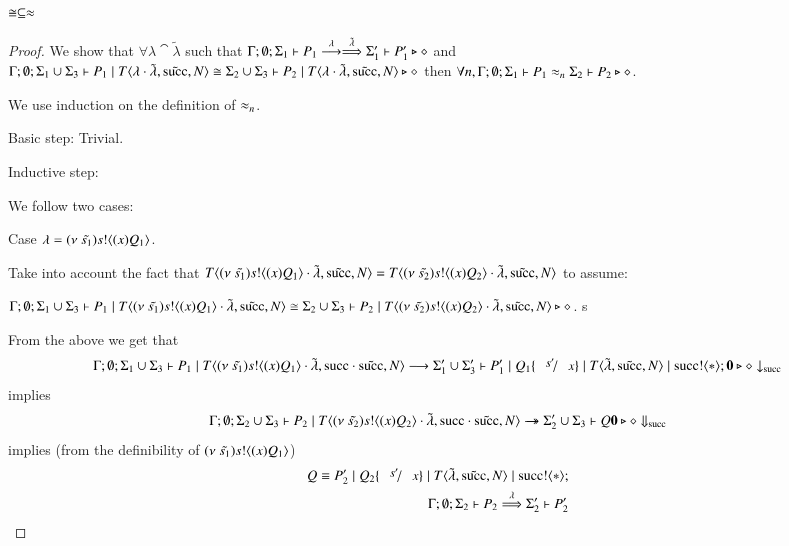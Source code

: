 \begin{lemma}\rm
	\label{lem:cong_is_wb}
	$\cong \subseteq \approx$
\end{lemma}

\begin{proof}
	We show that $\forall \lambda \cat \tilde{\lambda}$ such that $\Gamma; \emptyset; \Sigma_1 \vdash P_1 \stackrel{\lambda}{\longrightarrow} \stackrel{\tilde{\lambda}}{\Longrightarrow} \Sigma_1' \vdash P_1' \triangleright \diamond$
	and $\Gamma; \emptyset; \Sigma_1 \cup \Sigma_3 \vdash P_1 \;|\; T\langle \lambda \cdot \tilde{\lambda}, \tilde{\textrm{succ}}, N \rangle \cong \Sigma_2 \cup \Sigma_3 \vdash P_2 \;|\; T\langle \lambda \cdot \tilde{\lambda}, \tilde{\textrm{succ}}, N \rangle \triangleright \diamond$ then $\forall n, \Gamma; \emptyset; \Sigma_1 \vdash P_1 \approx_n \Sigma_2 \vdash P_2 \triangleright \diamond$.

	We use induction on the definition of $\approx_n$.

	Basic step: Trivial.

	Inductive step:

	We follow two cases:

	Case $\lambda = (\nu\ \tilde{s_1}) s ! \langle (x)Q_1 \rangle$.

	Take into account the fact that
	$T\langle (\nu\ \tilde{s_1}) s ! \langle (x)Q_1 \rangle \cdot \tilde{\lambda}, \tilde{\textrm{succ}}, N \rangle = T\langle (\nu\ \tilde{s_2}) s ! \langle (x)Q_2 \rangle \cdot \tilde{\lambda}, \tilde{\textrm{succ}}, N \rangle$
	to assume:

	$\Gamma; \emptyset; \Sigma_1 \cup \Sigma_3 \vdash P_1 \;|\; T\langle (\nu\ \tilde{s_1}) s ! \langle (x)Q_1 \rangle \cdot \tilde{\lambda}, \tilde{\textrm{succ}}, N \rangle \cong \Sigma_2 \cup \Sigma_3 \vdash P_2 \;|\; T\langle (\nu\ \tilde{s_2}) s ! \langle (x)Q_2 \rangle \cdot \tilde{\lambda}, \tilde{\textrm{succ}}, N \rangle \triangleright \diamond$.
s

	From the above we get that
	\[
		\Gamma; \emptyset; \Sigma_1 \cup \Sigma_3 \proves P_1 \Par T\lrangle{\news{\tilde{s_1}} \bactout{s}{\abs{x}{Q_1}} \cat \tilde{\lambda}, \suc \cat \tilde{\suc}, N} \red \Sigma_1' \cup \Sigma_3' \proves P_1' \Par Q_1 \subst{s'}{x} \Par T\lrangle{\tilde{\lambda}, \tilde{\suc}, N} \Par \bout{\suc}{\ast} \inact \hastype \Proc \barb{\suc}
	\]
	implies
	\[
		\Gamma; \emptyset; \Sigma_2 \cup \Sigma_3 \vdash P_2 \;|\; T\langle (\nu\ \tilde{s_2}) s ! \langle (x)Q_2 \rangle \cdot \tilde{\lambda}, \textrm{succ} \cdot \tilde{\textrm{succ}}, N \rangle \rightarrow\!\!\!\!\!\rightarrow \Sigma_2' \cup \Sigma_3 \vdash Q \mathbf{0} \triangleright \diamond \Downarrow_{\textrm{succ}}
	\]
	implies (from the definibility of $(\nu\ \tilde{s_1}) s ! \langle (x)Q_1 \rangle$)
	\begin{eqnarray}
		Q \scong P_2' \Par Q_2 \subst{s'}{x} \Par T\lrangle{\tilde{\lambda}, \tilde{\suc}, N} \Par \bout{\suc}{\ast}\\
		\Gamma; \emptyset; \Sigma_2 \proves P_2 \By{\lambda} \Sigma_2' \proves P_2'
	\end{eqnarray}


\end{proof}
